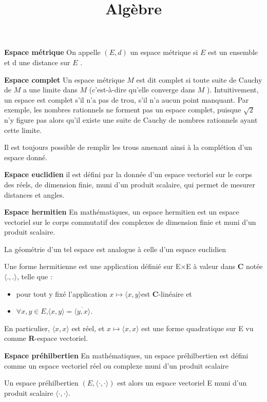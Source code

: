 \documentclass{article}
\begin{document}
\title{Alg\`ebre}
\maketitle
\tableofcontents
\newpage
\textbf{Espace m\'etrique}
On appelle $(E, d)$ un espace m\'etrique si $ E$  est un ensemble et d une distance sur $E$ .

\textbf{Espace complet}
Un espace m\'etrique $ M$  est dit complet si toute suite de Cauchy de $ M$  a une limite dans $ M$  (c'est-\`a-dire qu'elle converge dans $M$ ).\newline
Intuitivement, un espace est complet s'il n'a pas de trou, s'il n'a aucun point manquant. \newline
Par exemple, les nombres rationnels ne forment pas un espace complet, puisque $\sqrt{2}$ n'y figure pas alors qu'il existe une suite de Cauchy de nombres rationnels ayant cette limite.

Il est toujours possible de remplir les trous amenant ainsi \`a la compl\'etion d'un espace donn\'e.

\textbf{Espace euclidien}
 il est d\'efini par la donn\'ee d'un espace vectoriel sur le corps des r\'eels, de dimension finie, muni d'un produit scalaire, qui permet de mesurer distances et angles.

\textbf{Espace hermitien}
En math\'ematiques, un espace hermitien est un espace vectoriel sur le corps commutatif des complexes de dimension finie et muni d'un produit scalaire.

La g\'eom\'etrie d'un tel espace est analogue \`a celle d'un espace euclidien

Une forme hermitienne est une application d\'efini\'e sur E×E \`a valeur dans $\mathbf{C}$ not\'ee $\langle .,.\rangle$, telle que :
\begin{itemize}
		\item pour tout y fix\'e l'application $x \mapsto \langle x,y\rangle $est $\mathbf{C}$-lin\'eaire et
		\item $\forall x,y \in E$,$\langle x,y\rangle=\overline{ \langle y,x\rangle}$.
\end{itemize}
En particulier, $\langle x,x\rangle$ est r\'eel, et $x\mapsto \langle x,x\rangle$ est une forme quadratique sur E vu comme $\mathbf{R}$-espace vectoriel.

\textbf{Espace pr\'ehilbertien}
En math\'ematiques, un espace pr\'ehilbertien est d\'efini comme un espace vectoriel r\'eel ou complexe muni d'un produit scalaire

Un espace pr\'ehilbertien $(E,\langle\cdot,\cdot\rangle)$ est alors un espace vectoriel E muni d'un produit scalaire $\langle\cdot,\cdot\rangle$.
\end{document}
